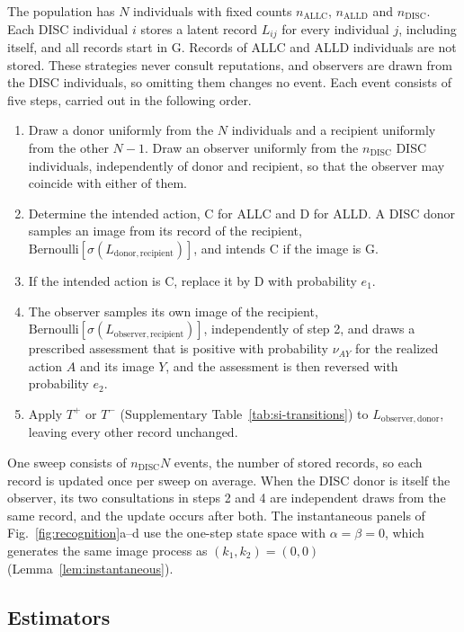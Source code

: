 \documentclass[10pt]{wlscirep}
\newcommand{\ALLC}{\mathrm{ALLC}}
\newcommand{\ALLD}{\mathrm{ALLD}}
\newcommand{\DISC}{\mathrm{DISC}}
\theoremstyle{plain}
\theoremstyle{remark}
\begin{document}
The population has $N$ individuals with fixed counts $n_{\ALLC}$, $n_{\ALLD}$ and $n_{\DISC}$. Each DISC individual $i$ stores a latent record $L_{ij}$ for every individual $j$, including itself, and all records start in G. Records of ALLC and ALLD individuals are not stored. These strategies never consult reputations, and observers are drawn from the DISC individuals, so omitting them changes no event. Each event consists of five steps, carried out in the following order.
\begin{enumerate}
\item Draw a donor uniformly from the $N$ individuals and a recipient uniformly from the other $N-1$. Draw an observer uniformly from the $n_{\DISC}$ DISC individuals, independently of donor and recipient, so that the observer may coincide with either of them.
\item Determine the intended action, C for ALLC and D for ALLD. A DISC donor samples an image from its record of the recipient, $\mathrm{Bernoulli}[\sigma(L_{\mathrm{donor,recipient}})]$, and intends C if the image is G.
\item If the intended action is C, replace it by D with probability $e_1$.
\item The observer samples its own image of the recipient, $\mathrm{Bernoulli}[\sigma(L_{\mathrm{observer,recipient}})]$, independently of step 2, and draws a prescribed assessment that is positive with probability $\nu_{AY}$ for the realized action $A$ and its image $Y$, and the assessment is then reversed with probability $e_2$.
\item Apply $T^+$ or $T^-$ (Supplementary Table~\ref{tab:si-transitions}) to $L_{\mathrm{observer,donor}}$, leaving every other record unchanged.
\end{enumerate}
One sweep consists of $n_{\DISC}N$ events, the number of stored records, so each record is updated once per sweep on average. When the DISC donor is itself the observer, its two consultations in steps 2 and 4 are independent draws from the same record, and the update occurs after both. The instantaneous panels of Fig.~\ref{fig:recognition}a--d use the one-step state space with $\alpha=\beta=0$, which generates the same image process as $(k_1,k_2)=(0,0)$ (Lemma~\ref{lem:instantaneous}).

\subsection{Estimators}
\end{document}
